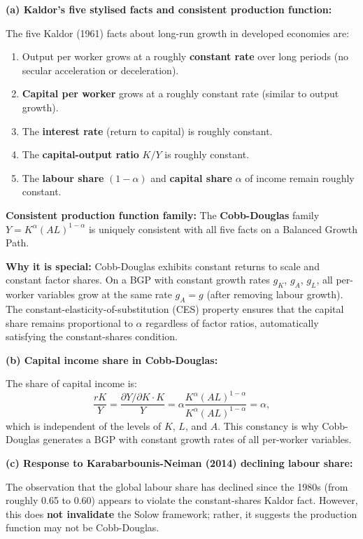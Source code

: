 \documentclass[a4paper,11pt]{article}
\begin{document}
\begin{answerbox}
\textbf{(a) Kaldor's five stylised facts and consistent production function:}

The five Kaldor (1961) facts about long-run growth in developed economies are:
\begin{enumerate}[label=(\roman*), itemsep=2pt]
    \item Output per worker grows at a roughly \textbf{constant rate} over long periods (no secular acceleration or deceleration).
    \item \textbf{Capital per worker} grows at a roughly constant rate (similar to output growth).
    \item The \textbf{interest rate} (return to capital) is roughly constant.
    \item The \textbf{capital-output ratio} $K/Y$ is roughly constant.
    \item The \textbf{labour share} $(1-\alpha)$ and \textbf{capital share} $\alpha$ of income remain roughly constant.
\end{enumerate}

\textbf{Consistent production function family:} The \textbf{Cobb-Douglas} family $Y = K^\alpha(AL)^{1-\alpha}$ is uniquely consistent with all five facts on a Balanced Growth Path.

\textbf{Why it is special:} Cobb-Douglas exhibits constant returns to scale and constant factor shares. On a BGP with constant growth rates $g_K$, $g_A$, $g_L$, all per-worker variables grow at the same rate $g_A = g$ (after removing labour growth). The constant-elasticity-of-substitution (CES) property ensures that the capital share remains proportional to $\alpha$ regardless of factor ratios, automatically satisfying the constant-shares condition.

\textbf{(b) Capital income share in Cobb-Douglas:}

The share of capital income is:
\[
    \frac{rK}{Y} = \frac{\partial Y/\partial K \cdot K}{Y}
    = \alpha \frac{K^\alpha(AL)^{1-\alpha}}{K^\alpha(AL)^{1-\alpha}}
    = \boxed{\alpha,}
\]
which is independent of the levels of $K$, $L$, and $A$. This constancy is why Cobb-Douglas generates a BGP with constant growth rates of all per-worker variables.

\textbf{(c) Response to Karabarbounis-Neiman (2014) declining labour share:}

The observation that the global labour share has declined since the 1980s (from roughly 0.65 to 0.60) appears to violate the constant-shares Kaldor fact. However, this does \textbf{not invalidate} the Solow framework; rather, it suggests the production function may not be Cobb-Douglas.


\end{answerbox}
\end{document}
